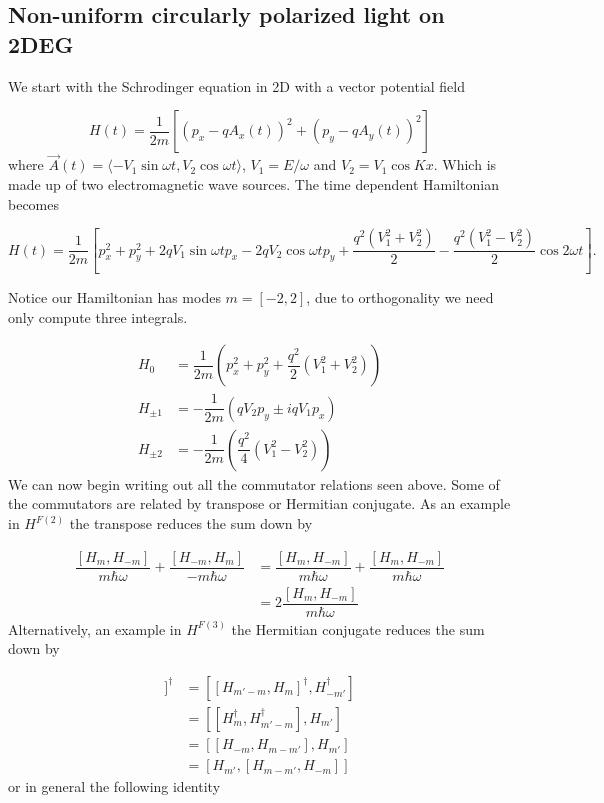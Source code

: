 \subsection{Non-uniform circularly polarized light on 2DEG}

We start with the Schrodinger equation in 2D with a vector potential field

\begin{equation}
  H(t) = \dfrac{1}{2m} \left[ (p_x - qA_x(t))^2 + (p_y - qA_y(t))^2 \right]
\end{equation}
where $\vec{A}(t) = \langle -V_1\sin{\omega t} , V_2\cos{\omega t} \rangle$, $V_1 = E/\omega$ and $V_2 = V_1 \cos{Kx}$.
Which is made up of two electromagnetic wave sources.
The time dependent Hamiltonian becomes

\begin{equation}
  H(t) = \dfrac{1}{2m} \left[ p_x^2 + p_y^2 + 2qV_1\sin{\omega t} p_x - 2qV_2\cos{\omega t} p_y + \dfrac{q^2(V_1^2+V_2^2)}{2} -\dfrac{q^2(V_1^2-V_2^2)}{2}\cos{2\omega t} \right].
\end{equation}

Notice our Hamiltonian has modes $m = [-2,2]$, due to orthogonality we need only compute three integrals.

\begin{align}
  H_0 &= \dfrac{1}{2m} \left(p_x^2 + p_y^2 + \dfrac{q^2}{2}(V_1^2+V_2^2) \right) \\
  H_{\pm1} &= -\dfrac{1}{2m} \left( qV_2 p_y \pm iqV_1p_x \right) \\
  H_{\pm2} &= -\dfrac{1}{2m} \left( \dfrac{q^2}{4} (V_1^2 - V_2^2) \right)
\end{align}
We can now begin writing out all the commutator relations seen above.
Some of the commutators are related by transpose or Hermitian conjugate.
As an example in $H^{F(2)}$ the transpose reduces the sum down by

\begin{align}
  \dfrac{[H_m,H_{-m}]}{m\hbar \omega} + \dfrac{[H_{-m}, H_m]}{-m\hbar\omega} &= \dfrac{[H_m,H_{-m}]}{m\hbar \omega} + \dfrac{[H_m, H_{-m}]}{m\hbar\omega} \\
  &= 2\dfrac{[H_m,H_{-m}]}{m\hbar \omega}
\end{align}
Alternatively, an example in $H^{F(3)}$ the Hermitian conjugate reduces the sum down by

\begin{align}
  [H_{-m'},[H_{m'-m},H_m]]^{\dagger} &= [[H_{m'-m},H_m]^{\dagger}, H_{-m'}^{\dagger}] \nonumber \\
  &= [ [H_m^{\dagger}, H_{m'-m}^{\dagger}], H_{m'}] \nonumber \\
  &= [ [H_{-m}, H_{m-m'}], H_{m'}] \nonumber \\
  &= [H_{m'}, [H_{m-m'}, H_{-m}]]
\end{align}
or in general the following identity

